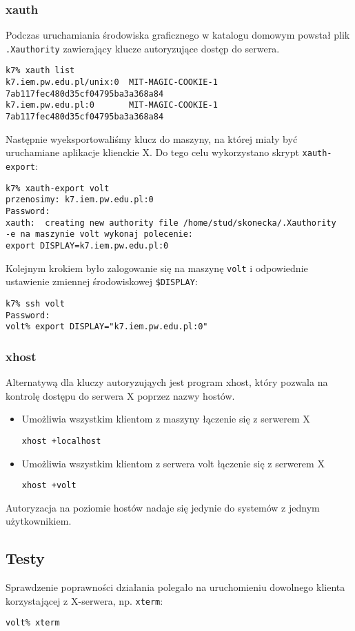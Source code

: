 \documentclass[a4paper,11pt,notitlepage]{article}
\begin{document}
\subsubsection{xauth}
Podczas uruchamiania środowiska graficznego w katalogu domowym powstał plik \texttt{.Xauthority} zawierający klucze autoryzujące dostęp do serwera.
\begin{verbatim}
k7% xauth list
k7.iem.pw.edu.pl/unix:0  MIT-MAGIC-COOKIE-1  7ab117fec480d35cf04795ba3a368a84
k7.iem.pw.edu.pl:0       MIT-MAGIC-COOKIE-1  7ab117fec480d35cf04795ba3a368a84
\end{verbatim}
Następnie wyeksportowaliśmy klucz do maszyny, na której miały być uruchamiane aplikacje klienckie X. Do tego celu wykorzystano skrypt \texttt{xauth-export}:
\begin{verbatim}
k7% xauth-export volt
przenosimy: k7.iem.pw.edu.pl:0
Password:
xauth:  creating new authority file /home/stud/skonecka/.Xauthority
-e na maszynie volt wykonaj polecenie:
export DISPLAY=k7.iem.pw.edu.pl:0
\end{verbatim}
Kolejnym krokiem było zalogowanie się na maszynę \texttt{volt} i odpowiednie ustawienie zmiennej środowiskowej \texttt{\$DISPLAY}:
\begin{verbatim}
k7% ssh volt
Password:
volt% export DISPLAY="k7.iem.pw.edu.pl:0"
\end{verbatim}
\subsubsection{xhost}
Alternatywą dla kluczy autoryzująych jest program xhost, który pozwala na kontrolę dostępu do serwera X poprzez nazwy hostów.
\begin{itemize}
\item Umożliwia wszystkim klientom z maszyny łączenie się z serwerem X
\begin{verbatim}
xhost +localhost
\end{verbatim}
\item Umożliwia wszystkim klientom z serwera volt łączenie się z serwerem X
\begin{verbatim}
xhost +volt
\end{verbatim}
\end{itemize}
Autoryzacja na poziomie hostów nadaje się jedynie do systemów z jednym użytkownikiem.


\subsection{Testy}
Sprawdzenie poprawności działania polegało na uruchomieniu dowolnego klienta korzystającej z X-serwera, np. \texttt{xterm}:
\begin{verbatim}
volt% xterm
\end{verbatim}
\end{document}
